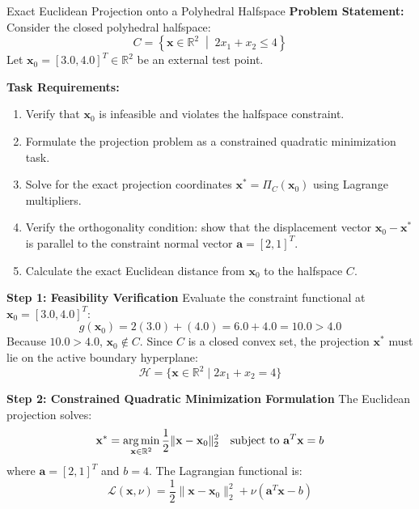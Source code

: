 \begin{examplebox}[breakable]{Exact Euclidean Projection onto a Polyhedral Halfspace}
\textbf{Problem Statement:}
Consider the closed polyhedral halfspace:
\begin{equation}
C = \left\{ \mathbf{x} \in \mathbb{R}^2 \;\middle|\; 2x_1 + x_2 \le 4 \right\}
\end{equation}
Let $\mathbf{x}_0 = [3.0, 4.0]^T \in \mathbb{R}^2$ be an external test point.

\textbf{Task Requirements:}
\begin{enumerate}
    \item Verify that $\mathbf{x}_0$ is infeasible and violates the halfspace constraint.
    \item Formulate the projection problem as a constrained quadratic minimization task.
    \item Solve for the exact projection coordinates $\mathbf{x}^* = \Pi_C(\mathbf{x}_0)$ using Lagrange multipliers.
    \item Verify the orthogonality condition: show that the displacement vector $\mathbf{x}_0 - \mathbf{x}^*$ is parallel to the constraint normal vector $\mathbf{a} = [2, 1]^T$.
    \item Calculate the exact Euclidean distance from $\mathbf{x}_0$ to the halfspace $C$.
\end{enumerate}

\tcblower

\textbf{Step 1: Feasibility Verification}
Evaluate the constraint functional at $\mathbf{x}_0 = [3.0, 4.0]^T$:
\begin{equation}
g(\mathbf{x}_0) = 2(3.0) + (4.0) = 6.0 + 4.0 = 10.0 > 4.0
\end{equation}
Because $10.0 > 4.0$, $\mathbf{x}_0 \notin C$. Since $C$ is a closed convex set, the projection $\mathbf{x}^*$ must lie on the active boundary hyperplane:
\begin{equation}
\mathcal{H} = \{\mathbf{x} \in \mathbb{R}^2 \mid 2x_1 + x_2 = 4\}
\end{equation}

\textbf{Step 2: Constrained Quadratic Minimization Formulation}
The Euclidean projection solves:
\begin{equation}
\mathbf{x}^* = \operatorname*{arg\,min}_{\mathbf{x} \in \mathbb{R}^2} \frac{1}{2} \|\mathbf{x} - \mathbf{x}_0\|_2^2 \quad \text{subject to } \mathbf{a}^T \mathbf{x} = b
\end{equation}
where $\mathbf{a} = [2, 1]^T$ and $b = 4$.
The Lagrangian functional is:
\begin{equation}
\mathcal{L}(\mathbf{x}, \nu) = \frac{1}{2}\|\mathbf{x} - \mathbf{x}_0\|_2^2 + \nu(\mathbf{a}^T \mathbf{x} - b)
\end{equation}


\end{examplebox}
